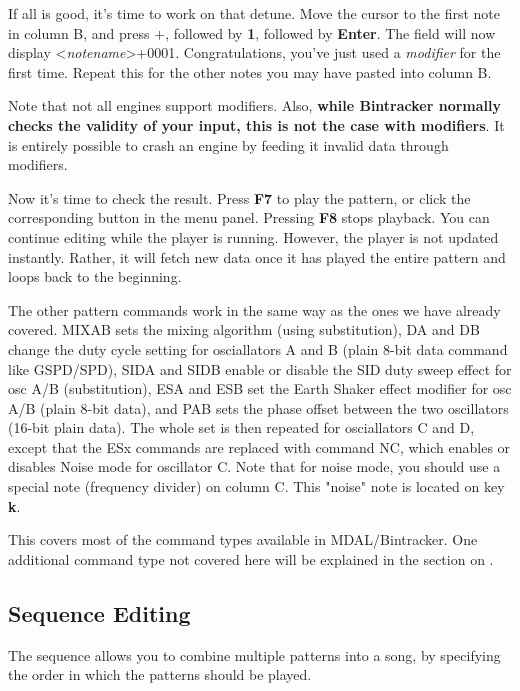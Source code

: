 \documentclass[12pt]{report}	%
\begin{document}
If all is good, it's time to work on that detune. Move the cursor to the first note in column B, and press \textbf{\(\bm{+}\)}, followed by \textbf{1}, followed by \textbf{Enter}. The field will now display \textless\textit{notename}\textgreater+0001. Congratulations, you've just used a \textit{modifier} for the first time. Repeat this for the other notes you may have pasted into column B. 

Note that not all engines support modifiers. Also, \textbf{while Bintracker normally checks the validity of your input, this is not the case with modifiers}. It is entirely possible to crash an engine by feeding it invalid data through modifiers.

Now it's time to check the result. Press \textbf{F7} to play the pattern, or click the corresponding button in the menu panel. Pressing \textbf{F8} stops playback. You can continue editing while the player is running. However, the player is not updated instantly. Rather, it will fetch new data once it has played the entire pattern and loops back to the beginning.

The other pattern commands work in the same way as the ones we have already covered. MIXAB sets the mixing algorithm (using substitution), DA and DB change the duty cycle setting for osciallators A and B (plain 8-bit data command like GSPD/SPD), SIDA and SIDB enable or disable the SID duty sweep effect for osc A/B (substitution), ESA and ESB set the Earth Shaker effect modifier for osc A/B (plain 8-bit data), and PAB sets the phase offset between the two oscillators (16-bit plain data). The whole set is then repeated for osciallators C and D, except that the ESx commands are replaced with command NC, which enables or disables Noise mode for oscillator C. Note that for noise mode, you should use a special note (frequency divider) on column C. This "noise" note is located on key \textbf{k}.

This covers most of the command types available in MDAL/Bintracker. One additional command type not covered here will be explained in the section on .

\subsection{Sequence Editing}
\label{subsec:editing-sequence}

The sequence allows you to combine multiple patterns into a song, by specifying the order in which the patterns should be played.
\end{document}
